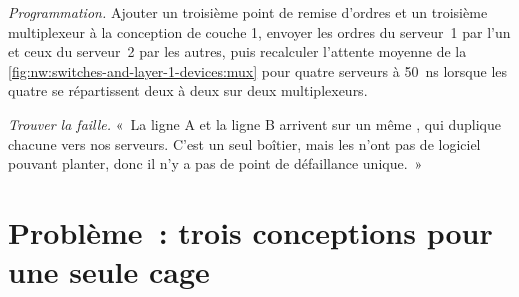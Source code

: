 \begin{exercise}[$\star\star\star$]\label{exo:nw:switches-and-layer-1-devices:7}
\emph{Programmation.} Ajouter un troisième point de remise d'ordres et un troisième multiplexeur à la conception de couche 1, envoyer les ordres du serveur~1 par l'un
et ceux du serveur~2 par les autres, puis recalculer l'attente moyenne de la \cref{fig:nw:switches-and-layer-1-devices:mux} pour quatre serveurs à
\qty{50}{\nano\second} lorsque les quatre se répartissent deux à deux sur deux multiplexeurs.
\end{exercise}

\begin{exercise}[$\star\star\star$]\label{exo:nw:switches-and-layer-1-devices:8}
\emph{Trouver la faille.} «~La ligne A et la ligne B arrivent sur un même , qui duplique chacune vers nos serveurs. C'est un seul boîtier,
mais les  n'ont pas de logiciel pouvant planter, donc il n'y a pas de point de défaillance unique.~»
\end{exercise}

\section{Problème~: trois conceptions pour une seule cage}


